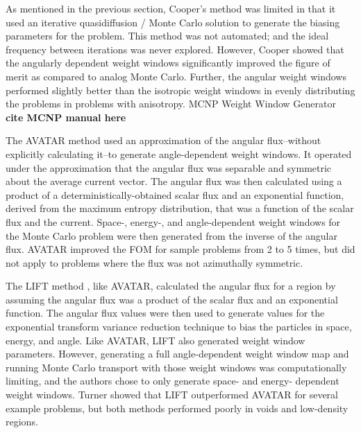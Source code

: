 As mentioned in the previous section, Cooper's method was limited in that it used an
iterative quasidiffusion / Monte Carlo solution to generate the biasing parameters for
the problem. This method was not automated; and the ideal frequency between iterations
was never explored. However, Cooper showed that the angularly dependent weight windows
significantly improved the figure of merit as compared to analog Monte Carlo. Further, the
angular weight windows performed slightly better than the isotropic weight windows in
evenly distributing the problems in problems with anisotropy.
MCNP Weight Window Generator \textbf{cite MCNP manual here}


The AVATAR method
\cite{van_riper_generation_1995, van_riper_avatarautomatic_1997} used an
approximation of the angular flux--without explicitly calculating it--to
generate angle-dependent weight windows. It operated under the approximation
that
the angular flux was separable and symmetric about the average current vector.
The angular flux was then calculated using
a product of a deterministically-obtained
scalar flux and an exponential function, derived from the
maximum entropy distribution, that was a function of the scalar flux and the
current. Space-, energy-, and angle-dependent weight windows for
the Monte Carlo problem were then generated from the inverse of the angular
flux. AVATAR improved the FOM for sample problems from 2 to 5 times, but did not
apply to problems where the flux was not azimuthally symmetric.

The LIFT method \cite{turner_automatic_1997, turner_automatic_1997-1}, like
AVATAR, calculated the angular flux for a region by assuming the angular flux
was a product of the scalar flux and an exponential function. The angular flux
values were then used to generate values for the exponential transform variance
reduction
technique to bias the particles in space, energy, and angle. Like AVATAR, LIFT
also generated weight window parameters. However, generating a full
angle-dependent weight window map and running Monte Carlo transport with those
weight windows was computationally limiting, and the authors chose to only
generate space- and energy- dependent weight windows. Turner showed that LIFT
outperformed AVATAR for several example problems, but both methods performed
poorly in voids and low-density regions.

